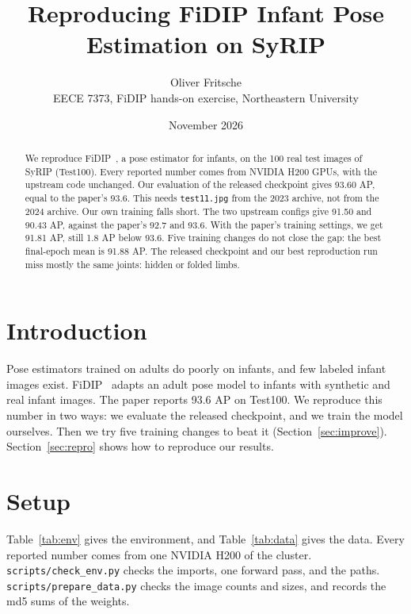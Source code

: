 \documentclass[11pt]{article}
\title{Reproducing FiDIP Infant Pose Estimation on SyRIP}
\author{Oliver Fritsche\\EECE 7373, FiDIP hands-on exercise, Northeastern University}
\date{November 2026}
\newcommand{\code}[1]{\texttt{#1}}
\begin{document}
\maketitle

\begin{abstract}
We reproduce FiDIP~\cite{huang2021fidip}, a pose estimator for infants, on the 100 real test images of SyRIP (Test100).
Every reported number comes from NVIDIA H200 GPUs, with the upstream code unchanged.
Our evaluation of the released checkpoint gives 93.60 AP, equal to the paper's 93.6.
This needs \code{test11.jpg} from the 2023 archive, not from the 2024 archive.
Our own training falls short.
The two upstream configs give 91.50 and 90.43 AP, against the paper's 92.7 and 93.6.
With the paper's training settings, we get 91.81 AP, still 1.8 AP below 93.6.
Five training changes do not close the gap: the best final-epoch mean is 91.88 AP.
The released checkpoint and our best reproduction run miss mostly the same joints: hidden or folded limbs.
\end{abstract}

\section{Introduction}

Pose estimators trained on adults do poorly on infants, and few labeled infant images exist.
FiDIP~\cite{huang2021fidip} adapts an adult pose model to infants with synthetic and real infant images.
The paper reports 93.6 AP on Test100.
We reproduce this number in two ways: we evaluate the released checkpoint, and we train the model ourselves.
Then we try five training changes to beat it (Section~\ref{sec:improve}).
Section~\ref{sec:repro} shows how to reproduce our results.

\section{Setup}

Table~\ref{tab:env} gives the environment, and Table~\ref{tab:data} gives the data.
Every reported number comes from one NVIDIA H200 of the cluster.
\code{scripts/check\_env.py} checks the imports, one forward pass, and the paths.
\code{scripts/prepare\_data.py} checks the image counts and sizes, and records the md5 sums of the weights.
\end{document}
